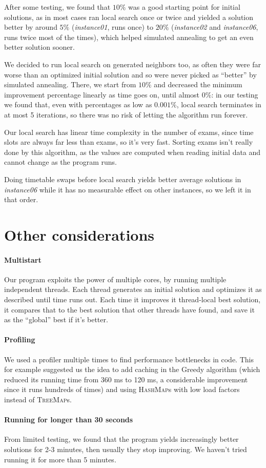 \documentclass[11pt, a4paper, leqno]{article}
\begin{document}
	After some testing, we found that $10\%$ was a good starting point for initial solutions, as in most cases ran local search once or twice and yielded a solution better by around $5\%$ (\textit{instance01}, runs once) to $20\%$ (\textit{instance02} and \textit{instance06}, runs twice most of the times), which helped simulated annealing to get an even better solution sooner.
	
	We decided to run local search on generated neighbors too, as often they were far worse than an optimized initial solution and so were never picked as ``better'' by simulated annealing. There, we start from $10\%$ and decreased the minimum improvement percentage linearly as time goes on, until almost $0\%$: in our testing we found that, even with percentages as low as $0.001\%$, local search terminates in at most 5 iterations, so there was no risk of letting the algorithm run forever.
	
	Our local search has linear time complexity in the number of exams, since time slots are always far less than exams, so it's very fast. Sorting exams isn't really done by this algorithm, as the values are computed when reading initial data and cannot change as the program runs.
	
	Doing timetable swaps before local search yields better average solutions in \textit{instance06} while it has no measurable effect on other instances, so we left it in that order.
	
	\section{Other considerations}
	
	\paragraph{Multistart}
	
	Our program exploits the power of multiple cores, by running multiple independent threads. Each thread generates an initial solution and optimizes it as described until time runs out. Each time it improves it thread-local best solution, it compares that to the best solution that other threads have found, and save it as the ``global'' best if it's better.
	
	\paragraph{Profiling}
	
	We used a profiler multiple times to find performance bottlenecks in code. This for example suggested us the idea to add caching in the Greedy algorithm (which reduced its running time from 360 ms to 120 ms, a considerable improvement since it runs hundreds of times) and using \textsc{HashMap}s with low load factors instead of \textsc{TreeMap}s.
	
	\paragraph{Running for longer than 30 seconds}
	
	From limited testing, we found that the program yields increasingly better solutions for 2-3 minutes, then usually they stop improving. We haven't tried running  it for more than 5 minutes.
	
\end{document}
